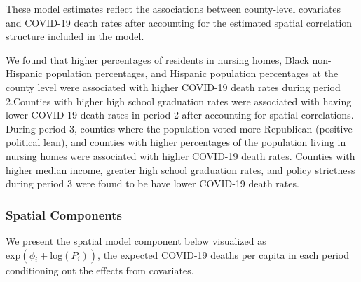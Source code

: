 \documentclass[
]{article}
\begin{document}
These model estimates reflect the associations between county-level
covariates and COVID-19 death rates after accounting for the estimated
spatial correlation structure included in the model.

We found that higher percentages of residents in nursing homes, Black
non-Hispanic population percentages, and Hispanic population percentages
at the county level were associated with higher COVID-19 death rates
during period 2.Counties with higher high school graduation rates were
associated with having lower COVID-19 death rates in period 2 after
accounting for spatial correlations. During period 3, counties where the
population voted more Republican (positive political lean), and counties
with higher percentages of the population living in nursing homes were
associated with higher COVID-19 death rates. Counties with higher median
income, greater high school graduation rates, and policy strictness
during period 3 were found to be have lower COVID-19 death rates.

\newpage

\hypertarget{spatial-components}{%
\subsubsection{Spatial Components}\label{spatial-components}}

We present the spatial model component below visualized as
\(\text{exp}(\phi_i + \text{log}(P_i))\), the expected COVID-19 deaths
per capita in each period conditioning out the effects from covariates.
\end{document}
